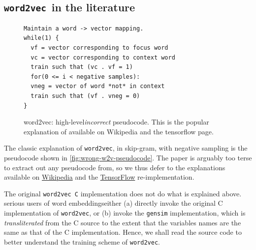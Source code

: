 \documentclass[11pt]{book}
\newcommand{\wtov}{\texttt{word2vec }}
\begin{document}
\subsection{\wtov in the literature}

\begin{figure}[htb]
\begin{verbatim}
Maintain a word -> vector mapping.
while(1) {
  vf = vector corresponding to focus word
  vc = vector corresponding to context word
  train such that (vc . vf = 1)
  for(0 <= i < negative samples):
  vneg = vector of word *not* in context
  train such that (vf . vneg = 0)
}
\end{verbatim}
\caption{word2vec:  high-level\emph{incorrect} pseudocode. This is the popular
    explanation of available on Wikipedia  and the tensorflow page.}
\label{fig:wrong-w2v-pseudocode}
\end{figure}

%

The classic explanation of \texttt{word2vec}, in skip-gram, with negative
sampling is the pseudocode shown in \autoref{fig:wrong-w2v-pseudocode}. The paper
is arguably too terse to extract out any pseudocode from, so we thus defer to the
explanations available on \href{https://en.wikipedia.org/wiki/Word2vec#Training_algorithm}{Wikipedia}
and the \href{https://www.tensorflow.org/tutorials/representation/word2vec}{TensorFlow} re-implementation.

The original \wtov \texttt{C} implementation does not do what is explained above.
serious users of word embeddingseither (a) directly invoke the original C
implementation of \texttt{word2vec}, or (b) invoke the \texttt{gensim}
implementation, which is \emph{transliterated} from the C source to the extent
that the variables names are the same as that of the C implementation. Hence, we shall read the source code to
better understand the training scheme of \texttt{word2vec}.
\end{document}
